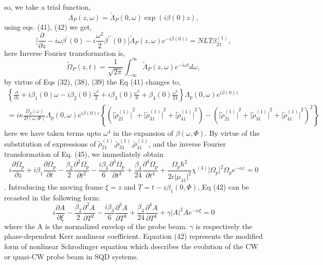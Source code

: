 \documentclass[12pt,a4paper]{article}
\begin{document}
so, we take a trial function,
\begin{equation}
    \Lambda_P(z,\omega)=\tilde\Lambda_P(0,\omega)\exp(i\beta(0)z),
\end{equation}
using eqs. (41), (42) we get,
\begin{equation}
    \big[\frac{\partial}{\partial z}-i\omega\beta^\prime(0)-i\frac{\omega^2}{2}\beta^{\prime\prime}(0)\big]\tilde\Lambda_P(z,\omega)e^{-i\beta(0)z}=NLT\beta^{(1)}_{21},
\end{equation}
here Inverse Fourier transformation is,
\begin{equation}
    \tilde\Omega_P(z,t)=\frac{1}{\sqrt{2\pi}}\int_{-\infty}^{\infty}\tilde\Lambda_P(z,\omega)e^{-i\omega t}d\omega,
\end{equation}
by virtue of Eqs (32), (38), (39) the Eq (41) changes to,
\begin{multline}
    {\left\lbrace{\frac{\partial}{\partial z}}+{i\beta_{1}(0)}     \omega -{i\beta_{2}(0)}\frac{\omega^2}{2}+{i\beta_{3}(0)}  \frac{\omega^3}{6}+{\beta_{4}(0)}\frac{\omega^4}{24}  \right\rbrace}{\Lambda_p{(0,\omega)}}e^{i{\beta{(0)}z}} \\ = {i\kappa}\frac{D_p{(\omega)}}{D{(\omega,\Phi)}}{\Lambda_p{(0,\omega)}}e^{i{\beta{(0)}z}}{\left\lbrace{{\left({\vert\tilde\rho^{(1)}_{21}\vert}^{2}+{\vert\tilde\rho^{(1)}_{31}\vert}^{2}+{\vert\tilde\rho^{(1)}_{41}\vert}^{2}\right)}-{\left({\vert\tilde\rho^{(1)}_{21}\vert}^{2}+{\vert\tilde\rho^{(1)}_{31}\vert}^{2}+{\vert\tilde\rho^{(1)}_{41}\vert}^{2}\right)}^2}\right\rbrace}
\end{multline}
here we have taken terms upto $\omega^{4}$ in the expansion of $\beta{(\omega ,\Phi)}$. By virtue of the substitution of expressions of $\tilde\rho^{(1)}_{21}$,$\tilde\rho^{(1)}_{31}$,$\tilde\rho^{(1)}_{41}$, and the inverse Fourier transformation of Eq. (45), we immediately obtain   
\begin{equation}
    {i\frac{\partial {\Omega_p}}{\partial z}}+{i\beta_{1}}{\frac{\partial {\Omega_p}}{\partial t}} -\frac{{\beta_{2}}}{2}{\frac{\partial^{2} {\Omega_p}}{\partial t^{2}}}-\frac{{i\beta_{3}}}{6}{\frac{\partial^{3} {\Omega_p}}{\partial t^{3}}}+\frac{{\beta_{4}}}{24}{\frac{\partial^{4} {\Omega_p}}{\partial t^{4}}}+{\frac{\Omega_{p}{\hbar}^{2}}{2c{\vert\mu_{41}\vert}^{2}}}{\chi^{(3)}}{\vert\Omega_{p}\vert}^{2}{\Omega_p}e^{-\alpha z} = 0
\end{equation}.
Introducing the moving frame $\xi = z$ and $T=t-z\beta_{1}{(0,\Phi)}$, Eq (42) can be recasted in the following form:
\begin{equation}
    {i\frac{\partial {A}}{\partial \xi}}-\frac{{\beta_{2}}}{2}{\frac{\partial^{2} {A}}{\partial T^{2}}}-\frac{{i\beta_{3}}}{6}{\frac{\partial^{3} {A}}{\partial T^{3}}}+\frac{{\beta_{4}}}{24}{\frac{\partial^{4} {A}}{\partial T^{4}}}+{\gamma}{\vert{A}\vert}^{2}Ae^{-\alpha \xi} = 0
\end{equation}
where the A is the normalized envelop of the probe beam. $\gamma$ is respectively the phase-dependent Kerr nonlinear coefficient. Equation (42) represents the modified form of nonlinear Schrodinger equation which describes the evolution of the CW or quasi-CW probe beam in SQD systems.
\end{document}
